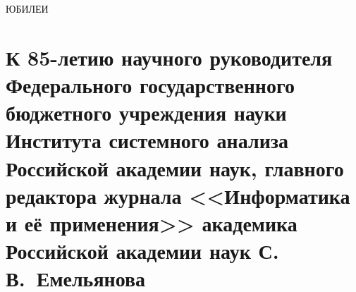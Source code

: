 \def\stat{rekl}





   \begin{center}

{\prgsh\LARGE
ЮБИЛЕИ}

\end{center}

\vspace*{6pt}


   \vspace*{8mm}

   \thispagestyle{empty}




\section*{К 85-летию научного руководителя Федерального
государственного бюджетного учреждения науки
Института системного анализа
Российской академии наук,
главного редактора журнала <<Информатика
и её применения>>  академика
Российской академии наук С.\,В.~Емельянова}






